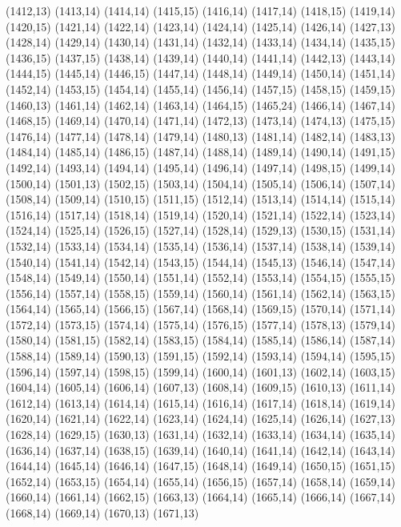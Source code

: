(1412,13)
(1413,14)
(1414,14)
(1415,15)
(1416,14)
(1417,14)
(1418,15)
(1419,14)
(1420,15)
(1421,14)
(1422,14)
(1423,14)
(1424,14)
(1425,14)
(1426,14)
(1427,13)
(1428,14)
(1429,14)
(1430,14)
(1431,14)
(1432,14)
(1433,14)
(1434,14)
(1435,15)
(1436,15)
(1437,15)
(1438,14)
(1439,14)
(1440,14)
(1441,14)
(1442,13)
(1443,14)
(1444,15)
(1445,14)
(1446,15)
(1447,14)
(1448,14)
(1449,14)
(1450,14)
(1451,14)
(1452,14)
(1453,15)
(1454,14)
(1455,14)
(1456,14)
(1457,15)
(1458,15)
(1459,15)
(1460,13)
(1461,14)
(1462,14)
(1463,14)
(1464,15)
(1465,24)
(1466,14)
(1467,14)
(1468,15)
(1469,14)
(1470,14)
(1471,14)
(1472,13)
(1473,14)
(1474,13)
(1475,15)
(1476,14)
(1477,14)
(1478,14)
(1479,14)
(1480,13)
(1481,14)
(1482,14)
(1483,13)
(1484,14)
(1485,14)
(1486,15)
(1487,14)
(1488,14)
(1489,14)
(1490,14)
(1491,15)
(1492,14)
(1493,14)
(1494,14)
(1495,14)
(1496,14)
(1497,14)
(1498,15)
(1499,14)
(1500,14)
(1501,13)
(1502,15)
(1503,14)
(1504,14)
(1505,14)
(1506,14)
(1507,14)
(1508,14)
(1509,14)
(1510,15)
(1511,15)
(1512,14)
(1513,14)
(1514,14)
(1515,14)
(1516,14)
(1517,14)
(1518,14)
(1519,14)
(1520,14)
(1521,14)
(1522,14)
(1523,14)
(1524,14)
(1525,14)
(1526,15)
(1527,14)
(1528,14)
(1529,13)
(1530,15)
(1531,14)
(1532,14)
(1533,14)
(1534,14)
(1535,14)
(1536,14)
(1537,14)
(1538,14)
(1539,14)
(1540,14)
(1541,14)
(1542,14)
(1543,15)
(1544,14)
(1545,13)
(1546,14)
(1547,14)
(1548,14)
(1549,14)
(1550,14)
(1551,14)
(1552,14)
(1553,14)
(1554,15)
(1555,15)
(1556,14)
(1557,14)
(1558,15)
(1559,14)
(1560,14)
(1561,14)
(1562,14)
(1563,15)
(1564,14)
(1565,14)
(1566,15)
(1567,14)
(1568,14)
(1569,15)
(1570,14)
(1571,14)
(1572,14)
(1573,15)
(1574,14)
(1575,14)
(1576,15)
(1577,14)
(1578,13)
(1579,14)
(1580,14)
(1581,15)
(1582,14)
(1583,15)
(1584,14)
(1585,14)
(1586,14)
(1587,14)
(1588,14)
(1589,14)
(1590,13)
(1591,15)
(1592,14)
(1593,14)
(1594,14)
(1595,15)
(1596,14)
(1597,14)
(1598,15)
(1599,14)
(1600,14)
(1601,13)
(1602,14)
(1603,15)
(1604,14)
(1605,14)
(1606,14)
(1607,13)
(1608,14)
(1609,15)
(1610,13)
(1611,14)
(1612,14)
(1613,14)
(1614,14)
(1615,14)
(1616,14)
(1617,14)
(1618,14)
(1619,14)
(1620,14)
(1621,14)
(1622,14)
(1623,14)
(1624,14)
(1625,14)
(1626,14)
(1627,13)
(1628,14)
(1629,15)
(1630,13)
(1631,14)
(1632,14)
(1633,14)
(1634,14)
(1635,14)
(1636,14)
(1637,14)
(1638,15)
(1639,14)
(1640,14)
(1641,14)
(1642,14)
(1643,14)
(1644,14)
(1645,14)
(1646,14)
(1647,15)
(1648,14)
(1649,14)
(1650,15)
(1651,15)
(1652,14)
(1653,15)
(1654,14)
(1655,14)
(1656,15)
(1657,14)
(1658,14)
(1659,14)
(1660,14)
(1661,14)
(1662,15)
(1663,13)
(1664,14)
(1665,14)
(1666,14)
(1667,14)
(1668,14)
(1669,14)
(1670,13)
(1671,13)
